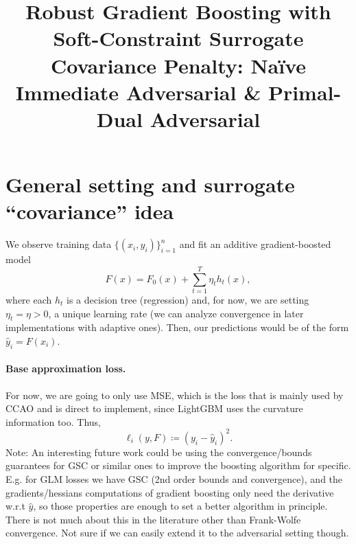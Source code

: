\documentclass[11pt]{article}
\title{Robust Gradient Boosting with Soft-Constraint Surrogate Covariance Penalty: Naïve Immediate Adversarial \& Primal-Dual Adversarial}
\author{} %
\date{}
\newcommand{\yh}{\hat y}
\theoremstyle{plain}
\theoremstyle{definition}
\newcommand{\1}{\mathbf{1}}
\begin{document}
\maketitle

\section{General setting and surrogate ``covariance'' idea}

We observe training data $\{(x_i,y_i)\}_{i=1}^n$ and fit an additive gradient-boosted model
\begin{equation}
F(x) = F_0(x) + \sum_{t=1}^T \eta_t h_t(x),
\end{equation}
where each $h_t$ is a decision tree (regression) and, for now, we are setting $\eta_t=\eta>0$, a unique learning rate {\color{red}(we can analyze convergence in later implementations with adaptive ones)}. Then, our predictions would be of the form $\yh_i=F(x_i)$.

\paragraph{Base approximation loss.}
For now, we are going to only use MSE, which is the loss that is mainly used by CCAO and is direct to implement, since LightGBM uses the curvature information too. Thus,
\begin{equation}
\ell_i(y, F) \coloneqq (y_i-\yh_i)^2.
\end{equation}
{\color{red} Note: An interesting future work could be using the convergence/bounds guarantees for GSC or similar ones to improve the boosting algorithm for specific. E.g. for GLM losses we have GSC (2nd order bounds and convergence), and the gradients/hessians computations of gradient boosting only need the derivative w.r.t $\hat{y}$, so those properties are enough to set a better algorithm in principle. There is not much about this in the literature other than Frank-Wolfe convergence. Not sure if we can easily extend it to the adversarial setting though. }
\end{document}
